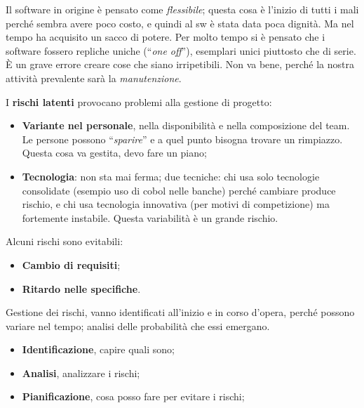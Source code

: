 Il software in origine è pensato come \textit{flessibile}; questa cosa è l'inizio di tutti i mali perché sembra avere poco costo, e quindi al sw è stata data poca dignità. Ma nel tempo ha acquisito un sacco di potere. Per molto tempo si è pensato che i software fossero repliche uniche (``\textit{one off}''), esemplari unici piuttosto che di serie. È un grave errore creare cose che siano irripetibili. Non va bene, perché la nostra attività prevalente sarà la \textit{manutenzione}.

I \textbf{rischi latenti} provocano problemi alla gestione di progetto:

\begin{itemize}

	\item \textbf{Variante nel personale}, nella disponibilità e nella composizione del team. Le persone possono ``\textit{sparire}'' e  a quel punto bisogna trovare un rimpiazzo. Questa cosa va gestita, devo fare un piano;
	
	\item \textbf{Tecnologia}: non sta mai ferma; due tecniche: chi usa solo tecnologie consolidate (esempio uso di cobol nelle banche) perché cambiare produce rischio, e chi usa tecnologia innovativa (per motivi di competizione) ma fortemente instabile. Questa variabilità è un grande rischio.

\end{itemize}

Alcuni rischi sono evitabili:

\begin{itemize}

	\item \textbf{Cambio di requisiti};
	
	\item \textbf{Ritardo nelle specifiche}.

\end{itemize}

Gestione dei rischi, vanno identificati all'inizio e in corso d'opera, perché possono variare nel tempo; analisi delle probabilità che essi emergano.

\begin{itemize}

	\item \textbf{Identificazione}, capire quali sono;
	
	\item \textbf{Analisi}, analizzare i rischi;
	
	\item \textbf{Pianificazione}, cosa posso fare per evitare i rischi;

\end{itemize}


